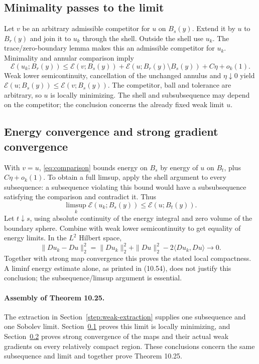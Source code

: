 \documentclass[11pt,a4paper]{article}
\numberwithin{equation}{section}
\theoremstyle{definition}
\theoremstyle{remark}
\newcommand{\E}{\mathcal E}
\begin{document}
\subsection{Minimality passes to the limit}\label{step:limit-minimality}
Let $v$ be an arbitrary admissible competitor for $u$ on $B_s(y)$.
Extend it by $u$ to $B_r(y)$ and join it to $u_k$ through the shell.
Outside the shell use $u_k$. The trace/zero-boundary lemma makes this an
admissible competitor for $u_k$. Minimality and annular comparison imply
\begin{equation}\label{eq:comparison}
 \E(u_k;B_r(y))\le\E(v;B_s(y))
 +\E(u;B_r(y)\setminus B_s(y))+C\eta+o_k(1).
\end{equation}
Weak lower semicontinuity, cancellation of the unchanged annulus and
$\eta\downarrow0$ yield $\E(u;B_s(y))\le\E(v;B_s(y))$.
The competitor, ball and tolerance are arbitrary, so $u$ is locally
minimizing. The shell and subsubsequence may depend on the competitor;
the conclusion concerns the already fixed weak limit $u$.

\subsection{Energy convergence and strong gradient convergence}
\label{step:strong-convergence}
With $v=u$, \eqref{eq:comparison} bounds energy on $B_s$ by energy of
$u$ on $B_t$, plus $C\eta+o_k(1)$. To obtain a full limsup, apply the
shell argument to every subsequence: a subsequence violating this bound
would have a subsubsequence satisfying the comparison and contradict it.
Thus
\[
 \limsup_k\E(u_k;B_s(y))\le\E(u;B_t(y)).
\]
Let $t\downarrow s$, using absolute continuity of the energy integral and
zero volume of the boundary sphere. Combine with weak lower semicontinuity
to get equality of energy limits. In the $L^2$ Hilbert space,
\begin{equation}\label{eq:hilbert-strong}
 \|Du_k-Du\|_2^2=\|Du_k\|_2^2+\|Du\|_2^2
              -2\langle Du_k,Du\rangle\longrightarrow0.
\end{equation}
Together with strong map convergence this proves the stated local
compactness. A liminf energy estimate alone, as printed in (10.54), does
not justify this conclusion; the subsequence/limsup argument is essential.

\paragraph{Assembly of Theorem 10.25.}\label{proof:compactness-assembly}
The extraction in Section~\ref{step:weak-extraction} supplies one subsequence
and one Sobolev limit. Section~\ref{step:limit-minimality} proves this
limit is locally minimizing, and Section~\ref{step:strong-convergence}
proves strong convergence of the maps and their actual weak gradients
on every relatively compact region. These conclusions concern the same
subsequence and limit and together prove Theorem 10.25.
\end{document}
